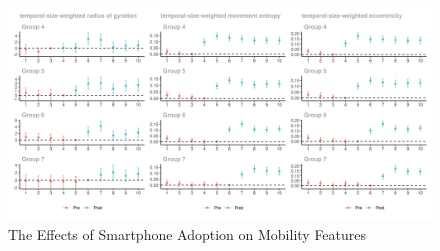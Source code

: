 \clearpage\newpage
\begin{figure}[ht!]
\centering
\caption{The Effects of Smartphone Adoption on Mobility Features}

\includegraphics[width=1.5\textwidth, angle=90]{figures/csdid/cohort_specific_ATT_dynamics/smartphone_adoption_mobility.png}

\label{fig:attgt_smartphone_adoption_mobility}
\end{figure}
